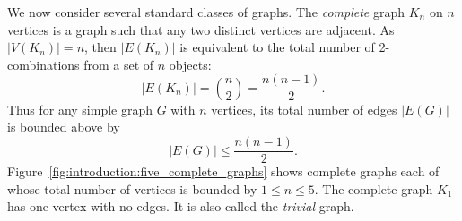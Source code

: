 We now consider several standard classes of graphs. The \emph{complete}
graph $K_n$ on $n$ vertices is a graph such that any two distinct
vertices are adjacent. As $|V(K_n)| = n$, then $|E(K_n)|$ is
equivalent to the total number of 2-combinations from a set of $n$
objects:
%
\begin{equation}
\label{eq:introduction:size_of_K_n}
|E(K_n)|
=
\binom{n}{2}
=
\frac{n(n-1)}{2}.
\end{equation}
%
Thus for any simple graph $G$ with $n$ vertices, its total number of
edges $|E(G)|$ is bounded above by
%
\begin{equation}
\label{eq:introduction:upper_bound_total_edges_simple_graph}
|E(G)|
\leq
\frac{n(n - 1)}{2}.
\end{equation}
%
Figure~\ref{fig:introduction:five_complete_graphs} shows complete
graphs each of whose total number of vertices is bounded by
$1 \leq n \leq 5$. The complete graph $K_1$ has one vertex with
no edges. It is also called the \emph{trivial} graph.

